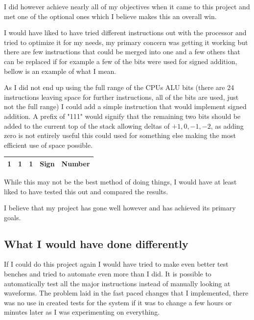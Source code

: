 \documentclass	[a4paper, 10pt]	{article}
\begin{document}
    I did however achieve nearly all of my objectives when it came to this project and
    met one of the optional ones which I believe makes this an overall win.

    I would have liked to have tried different instructions out with the processor and
    tried to optimize it for my needs, my primary concern was getting it working but
    there are few instructions that could be merged into one and a few others that can
    be replaced if for example a few of the bits were used for signed addition, bellow
    is an example of what I mean.

    As I did not end up using the full range of the CPUs ALU bits (there are 24 instructions
    leaving space for further instructions, all of the bits are used, just not the full range)
    I could add a simple instruction that would implement signed addition. A prefix of "111"
    would signify that the remaining two bits should be added to the current top of the stack
    allowing deltas of $+1,0,-1,-2$, as adding zero is not entirely useful this could used for
    something else making the most efficient use of space possible.

    \begin{center}
      \begin{tabular}{l | c | c | c | r }
        \hline
        1 & 1 & 1 & Sign & Number \\
        \hline
      \end{tabular}
    \end{center}

    While this may not be the best method of doing things, I would have at least liked to
    have tested this out and compared the results.

    I believe that my project has gone well however and has achieved its primary goals.

    \subsection{What I would have done differently}

    If I could do this project again I would have tried to make even better test benches
    and tried to automate even more than I did. It is possible to automatically test all
    the major instructions instead of manually looking at waveforms. The problem laid in
    the fast paced changes that I implemented, there was no use in created tests for the
    system if it was to change a few hours or minutes later as I was experimenting on 
    everything.
\end{document}
